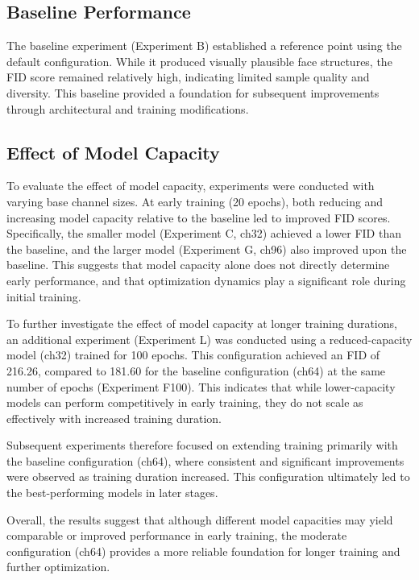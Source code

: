 \documentclass[conference]{IEEEtran}
\begin{document}
\subsection{Baseline Performance}
The baseline experiment (Experiment B) established a reference point using the default configuration. While it produced visually plausible face structures, the FID score remained relatively high, indicating limited sample quality and diversity.
This baseline provided a foundation for subsequent improvements through architectural and training modifications.

\subsection{Effect of Model Capacity}

To evaluate the effect of model capacity, experiments were conducted with varying base channel sizes. At early training (20 epochs), both reducing and increasing model capacity relative to the baseline led to improved FID scores. Specifically, the smaller model (Experiment C, ch32) achieved a lower FID than the baseline, and the larger model (Experiment G, ch96) also improved upon the baseline. This suggests that model capacity alone does not directly determine early performance, and that optimization dynamics play a significant role during initial training.

To further investigate the effect of model capacity at longer training durations, an additional experiment (Experiment L) was conducted using a reduced-capacity model (ch32) trained for 100 epochs. This configuration achieved an FID of 216.26, compared to 181.60 for the baseline configuration (ch64) at the same number of epochs (Experiment F100). This indicates that while lower-capacity models can perform competitively in early training, they do not scale as effectively with increased training duration.

Subsequent experiments therefore focused on extending training primarily with the baseline configuration (ch64), where consistent and significant improvements were observed as training duration increased. This configuration ultimately led to the best-performing models in later stages.

Overall, the results suggest that although different model capacities may yield comparable or improved performance in early training, the moderate configuration (ch64) provides a more reliable foundation for longer training and further optimization.
\end{document}
